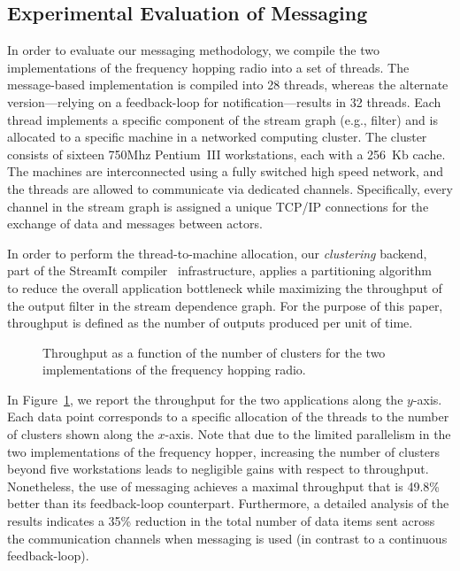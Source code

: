 \subsection{Experimental Evaluation of Messaging}

In order to evaluate our messaging methodology, we compile the two
implementations of the frequency hopping radio into a set of
threads. The message-based implementation is compiled into 28 threads,
whereas the alternate version---relying on a feedback-loop for
notification---results in 32 threads.  Each thread implements a
specific component of the stream graph (e.g., filter) and is allocated
to a specific machine in a networked computing cluster.  The cluster
consists of sixteen 750Mhz Pentium~III workstations, each with a
256~Kb cache.  The machines are interconnected using a fully switched
high speed network, and the threads are allowed to communicate via
dedicated channels. Specifically, every channel in the stream graph is
assigned a unique TCP/IP connections for the exchange of data and
messages between actors.

In order to perform the thread-to-machine allocation, our {\it
clustering} backend, part of the StreamIt
compiler~\cite{streamit-asplos} infrastructure, applies a partitioning
algorithm~\cite{thies-msp} to reduce the overall application
bottleneck while maximizing the throughput of the output filter in the
stream dependence graph. For the purpose of this paper, throughput is
defined as the number of outputs produced per unit of time.

\begin{figure}[t]
\caption{\small Throughput as a function of the number of clusters for
the two implementations of the frequency hopping radio.
\protect\label{fig:fhr-throughput}}
\end{figure}

In Figure~\ref{fig:fhr-throughput}, we report the throughput for the
two applications along the $y$-axis.  Each data point corresponds to a
specific allocation of the threads to the number of clusters shown
along the $x$-axis.  Note that due to the limited parallelism in the
two implementations of the frequency hopper, increasing the number of
clusters beyond five workstations leads to negligible gains with
respect to throughput.  Nonetheless, the use of messaging achieves a
maximal throughput that is 49.8\% better than its feedback-loop
counterpart. Furthermore, a detailed analysis of the results indicates
a 35\% reduction in the total number of data items sent across the
communication channels when messaging is used (in contrast to a
continuous feedback-loop).

